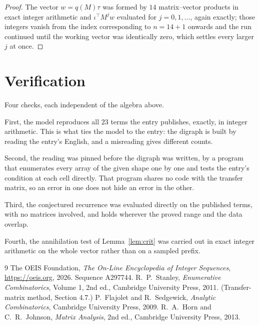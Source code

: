 \documentclass[11pt,a4paper]{article}
\theoremstyle{plain}
\theoremstyle{definition}
\begin{document}
\begin{proof}
The vector $w=q(M)\tau$ was formed by $14$ matrix--vector products in exact integer
arithmetic and $\iota^{\!\top}M^{j}w$ evaluated for $j=0,1,\dots$, again exactly; those
integers vanish from the index corresponding to $n=14+1$ onwards and the run continued
until the working vector was identically zero, which settles every larger $j$ at once.
\end{proof}

\section{Verification}

Four checks, each independent of the algebra above.

First, the model reproduces all $23$ terms the entry publishes, exactly, in integer
arithmetic. This is what ties the model to the entry: the digraph is built by reading the
entry's English, and a misreading gives different counts.

Second, the reading was pinned before the digraph was written, by a program that enumerates
every array of the given shape one by one and tests the entry's condition at each cell
directly. That program shares no code with the transfer matrix, so an error in one does not
hide an error in the other.

Third, the conjectured recurrence was evaluated directly on the published terms, with no
matrices involved, and holds wherever the proved range and the data overlap.

Fourth, the annihilation test of Lemma~\ref{lem:crit} was carried out in exact integer
arithmetic on the whole vector rather than on a sampled prefix.

\begin{thebibliography}{9}
 The OEIS Foundation, \emph{The On-Line Encyclopedia of Integer
Sequences}, \url{https://oeis.org}, 2026. Sequence A297744.
 R.~P.~Stanley, \emph{Enumerative Combinatorics}, Volume 1, 2nd ed.,
Cambridge University Press, 2011. (Transfer-matrix method, Section 4.7.)
 P.~Flajolet and R.~Sedgewick, \emph{Analytic Combinatorics}, Cambridge
University Press, 2009.
 R.~A.~Horn and C.~R.~Johnson, \emph{Matrix Analysis}, 2nd ed., Cambridge
University Press, 2013.
\end{thebibliography}
\end{document}
